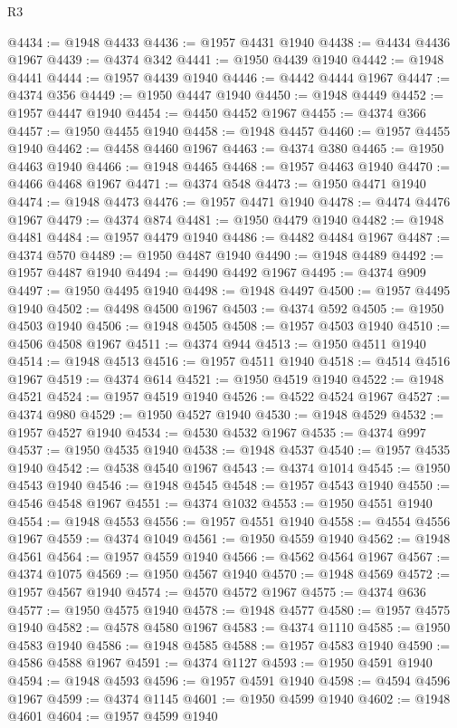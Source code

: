\begin{lexlean}{R3}
\begin{coremodule}
@4434 := @1948 @4433
@4436 := @1957 @4431 @1940
@4438 := @4434 @4436 @1967
@4439 := @4374 @342
@4441 := @1950 @4439 @1940
@4442 := @1948 @4441
@4444 := @1957 @4439 @1940
@4446 := @4442 @4444 @1967
@4447 := @4374 @356
@4449 := @1950 @4447 @1940
@4450 := @1948 @4449
@4452 := @1957 @4447 @1940
@4454 := @4450 @4452 @1967
@4455 := @4374 @366
@4457 := @1950 @4455 @1940
@4458 := @1948 @4457
@4460 := @1957 @4455 @1940
@4462 := @4458 @4460 @1967
@4463 := @4374 @380
@4465 := @1950 @4463 @1940
@4466 := @1948 @4465
@4468 := @1957 @4463 @1940
@4470 := @4466 @4468 @1967
@4471 := @4374 @548
@4473 := @1950 @4471 @1940
@4474 := @1948 @4473
@4476 := @1957 @4471 @1940
@4478 := @4474 @4476 @1967
@4479 := @4374 @874
@4481 := @1950 @4479 @1940
@4482 := @1948 @4481
@4484 := @1957 @4479 @1940
@4486 := @4482 @4484 @1967
@4487 := @4374 @570
@4489 := @1950 @4487 @1940
@4490 := @1948 @4489
@4492 := @1957 @4487 @1940
@4494 := @4490 @4492 @1967
@4495 := @4374 @909
@4497 := @1950 @4495 @1940
@4498 := @1948 @4497
@4500 := @1957 @4495 @1940
@4502 := @4498 @4500 @1967
@4503 := @4374 @592
@4505 := @1950 @4503 @1940
@4506 := @1948 @4505
@4508 := @1957 @4503 @1940
@4510 := @4506 @4508 @1967
@4511 := @4374 @944
@4513 := @1950 @4511 @1940
@4514 := @1948 @4513
@4516 := @1957 @4511 @1940
@4518 := @4514 @4516 @1967
@4519 := @4374 @614
@4521 := @1950 @4519 @1940
@4522 := @1948 @4521
@4524 := @1957 @4519 @1940
@4526 := @4522 @4524 @1967
@4527 := @4374 @980
@4529 := @1950 @4527 @1940
@4530 := @1948 @4529
@4532 := @1957 @4527 @1940
@4534 := @4530 @4532 @1967
@4535 := @4374 @997
@4537 := @1950 @4535 @1940
@4538 := @1948 @4537
@4540 := @1957 @4535 @1940
@4542 := @4538 @4540 @1967
@4543 := @4374 @1014
@4545 := @1950 @4543 @1940
@4546 := @1948 @4545
@4548 := @1957 @4543 @1940
@4550 := @4546 @4548 @1967
@4551 := @4374 @1032
@4553 := @1950 @4551 @1940
@4554 := @1948 @4553
@4556 := @1957 @4551 @1940
@4558 := @4554 @4556 @1967
@4559 := @4374 @1049
@4561 := @1950 @4559 @1940
@4562 := @1948 @4561
@4564 := @1957 @4559 @1940
@4566 := @4562 @4564 @1967
@4567 := @4374 @1075
@4569 := @1950 @4567 @1940
@4570 := @1948 @4569
@4572 := @1957 @4567 @1940
@4574 := @4570 @4572 @1967
@4575 := @4374 @636
@4577 := @1950 @4575 @1940
@4578 := @1948 @4577
@4580 := @1957 @4575 @1940
@4582 := @4578 @4580 @1967
@4583 := @4374 @1110
@4585 := @1950 @4583 @1940
@4586 := @1948 @4585
@4588 := @1957 @4583 @1940
@4590 := @4586 @4588 @1967
@4591 := @4374 @1127
@4593 := @1950 @4591 @1940
@4594 := @1948 @4593
@4596 := @1957 @4591 @1940
@4598 := @4594 @4596 @1967
@4599 := @4374 @1145
@4601 := @1950 @4599 @1940
@4602 := @1948 @4601
@4604 := @1957 @4599 @1940

\end{coremodule}
\end{lexlean}
